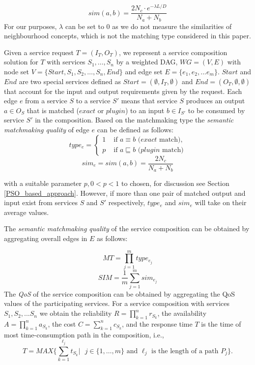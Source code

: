 \begin{equation}
sim(a, b){=} \frac{2N_c \cdot e^{-\lambda L/D} }{N_{a}+N_{b}}
\label{equation1}
\end{equation}
\noindent For our purposes, $\lambda$ can be set to 0 as we do not measure the similarities of neighbourhood concepts, which is not the matching type considered in this paper. 

Given a service request $T=(I_T,O_T)$, we represent a service composition solution for $T$ with services $S_1,\ldots,S_n$  by a weighted DAG, $WG=(V,E)$ with node set $V=\{Start, S_1, S_2, \ldots, S_n, End\}$ and edge set $E = \{e_{1}, e_{2},... e_{m} \}$. $Start$ and $End$ are two special services defined as $Start = (\emptyset, I_T, \emptyset )$ and $End  = (O_T, \emptyset, \emptyset)$ that account for the input and output requirements given by the request. 
Each edge $e$ from a service $S$ to a service $S'$ means that service $S$ produces an output $a\in O_S$ that is matched ($exact$ or $plugin$) to an input $b\in I_{S'}$ to be consumed by service $S'$ in the composition. Based on the matchmaking type the \emph{semantic matchmaking quality} of edge $e$ can be defined as follows:
\begin{equation}
\label{equation10}
type_e = 
\begin{cases}
	1 & \text{ if $a\equiv b$ ($exact$ match)},\\
	p & \text{ if $a \sqsubseteq b$ ($plugin$ match)}
\end{cases}
\end{equation}
\begin{equation}
\label{equation11}
sim_e = sim(a,b) = \frac{2N_c}{N_{a}+N_{b}}
\end{equation}

\noindent with a suitable parameter $p, 0<p< 1$ to chosen, for discussion see Section \ref{PSO_based_approach}. However, if more than one pair of matched output and input exist from services $S$ and $S'$ respectively, $type_e$ and $sim_e$ will take on their average values.

The \emph{semantic matchmaking quality} of the service composition can be obtained by aggregating overall edges in $E$ as follows:

\begin{equation}
\label{equation6}
MT {=} \prod_{j=1}^{m} type_ {e_{j}}
\end{equation}
\begin{equation}
\label{equation7}
SIM {=} \frac{1}{m}\sum_{j=1}^m sim_ {e_{j}}
\end{equation}
The \emph{QoS} of the service composition can be obtained by aggregating the QoS values of the participating services. For a service composition with services $ S_1, S_2, ... S_n$ we obtain the reliability $R=\prod\limits^n_{k=1}r_{S_k}$, the availability $A=\prod\limits^n_{k=1}a_{S_k}$, the cost $C=\sum\limits^n_{k=1}c_{S_k}$, and the response time $T$ is the time of most time-consumption path in the composition, i.e., $$T = MAX \{\sum\limits^{\ell_j}_{k=1}t_{S_k} | \text{ $j\in\{1,\ldots,m\}$ and $\ell_j$ is the length of a path $P_j$}\}.$$


